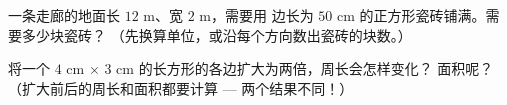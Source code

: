 \begin{exercise}[$\star\star$]\label{exo:g5:areas:10}
一条走廊的地面长 $12$ m、宽 $2$ m，需要用
边长为 $50$ cm 的正方形瓷砖铺满。需要多少块瓷砖？
（先换算单位，或沿每个方向数出瓷砖的块数。）
\end{exercise}

\begin{exercise}[$\star\star$]\label{exo:g5:areas:11}
将一个 $4$ cm $\times$ $3$ cm 的长方形的各边扩大为两倍，周长会怎样变化？
面积呢？（扩大前后的周长和面积都要计算 ---
两个结果不同！）
\end{exercise}
